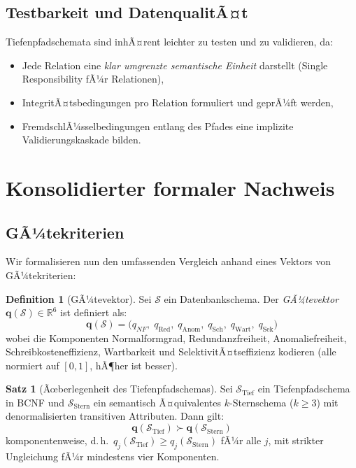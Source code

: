 ﻿\documentclass[12pt,a4paper]{article}
\theoremstyle{definition}
\newtheorem{definition}{Definition}[section]
\newtheorem{theorem}{Satz}[section]
\theoremstyle{remark}
\newcommand{\NF}{\mathit{NF}}
\begin{document}
\subsection{Testbarkeit und DatenqualitÃ¤t}

Tiefenpfadschemata sind inhÃ¤rent leichter zu testen und zu validieren,
da:
\begin{itemize}
  \item Jede Relation eine \emph{klar umgrenzte semantische Einheit} darstellt
        (Single Responsibility fÃ¼r Relationen),
  \item IntegritÃ¤tsbedingungen pro Relation formuliert und geprÃ¼ft werden,
  \item FremdschlÃ¼sselbedingungen entlang des Pfades eine implizite
        Validierungskaskade bilden.
\end{itemize}

\section{Konsolidierter formaler Nachweis}
\label{sec:beweis}

\subsection{GÃ¼tekriterien}

Wir formalisieren nun den umfassenden Vergleich anhand eines Vektors von
GÃ¼tekriterien:

\begin{definition}[GÃ¼tevektor]
Sei $\mathcal{S}$ ein Datenbankschema. Der \emph{GÃ¼tevektor}
$\mathbf{q}(\mathcal{S}) \in \mathbb{R}^6$ ist definiert als:
\[
  \mathbf{q}(\mathcal{S}) = \bigl(
    q_{\NF},\; q_{\text{Red}},\; q_{\text{Anom}},\;
    q_{\text{Sch}},\; q_{\text{Wart}},\; q_{\text{Sek}}
  \bigr)
\]
wobei die Komponenten Normalformgrad, Redundanzfreiheit,
Anomaliefreiheit, Schreibkosteneffizienz, Wartbarkeit und
SelektivitÃ¤tseffizienz kodieren (alle normiert auf $[0,1]$,
hÃ¶her ist besser).
\end{definition}

\begin{theorem}[Ãœberlegenheit des Tiefenpfadschemas]
\label{thm:hauptsatz}
Sei $\mathcal{S}_{\text{Tief}}$ ein Tiefenpfadschema in BCNF und
$\mathcal{S}_{\text{Stern}}$ ein semantisch Ã¤quivalentes $k$-Sternschema
($k \geq 3$) mit denormalisierten transitiven Attributen. Dann gilt:
\[
  \mathbf{q}(\mathcal{S}_{\text{Tief}}) \succ \mathbf{q}(\mathcal{S}_{\text{Stern}})
\]
komponentenweise, d.\,h.\ $q_j(\mathcal{S}_{\text{Tief}}) \geq q_j(\mathcal{S}_{\text{Stern}})$
fÃ¼r alle $j$, mit strikter Ungleichung fÃ¼r mindestens vier Komponenten.
\end{theorem}
\end{document}
